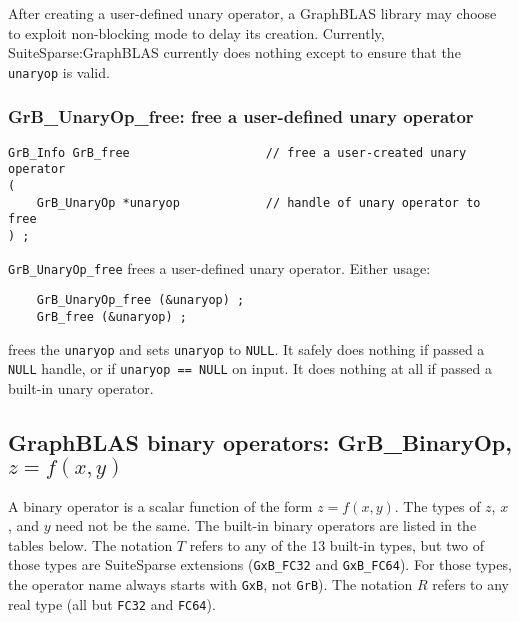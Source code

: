 \documentclass[12pt]{article}
\begin{document}
After creating a user-defined unary operator, a GraphBLAS library may choose to
exploit non-blocking mode to delay its creation.  Currently,
SuiteSparse:GraphBLAS currently does nothing except to ensure that the
\verb'unaryop' is valid.

\subsubsection{{\sf GrB\_UnaryOp\_free:} free a user-defined unary operator}
\label{unaryop_free}

\begin{mdframed}[userdefinedwidth=6in]
{\footnotesize
\begin{verbatim}
GrB_Info GrB_free                   // free a user-created unary operator
(
    GrB_UnaryOp *unaryop            // handle of unary operator to free
) ;
\end{verbatim}
}\end{mdframed}

\verb'GrB_UnaryOp_free' frees a user-defined unary operator.
Either usage:

    {\small
    \begin{verbatim}
    GrB_UnaryOp_free (&unaryop) ;
    GrB_free (&unaryop) ; \end{verbatim}}

\noindent
frees the \verb'unaryop' and sets \verb'unaryop' to \verb'NULL'.
It safely does nothing if passed a \verb'NULL'
handle, or if \verb'unaryop == NULL' on input.
It does nothing at all if passed a built-in unary operator.

\newpage
\subsection{GraphBLAS binary operators: {\sf GrB\_BinaryOp}, $z=f(x,y)$} %
\label{binaryop}

A binary operator is a scalar function of the form $z=f(x,y)$.  The types of
$z$, $x$, and $y$ need not be the same.  The built-in binary operators are
listed in the tables below.  The notation $T$ refers to any of the 13
built-in types, but two of those types are SuiteSparse extensions
(\verb'GxB_FC32' and \verb'GxB_FC64').  For those types, the operator name
always starts with \verb'GxB', not \verb'GrB').
The notation $R$ refers to any real type (all but \verb'FC32' and \verb'FC64').
\end{document}
